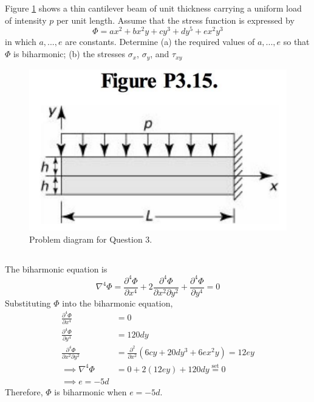 \section{}
Figure \ref{fig:Q3ProblemDiagram} shows a thin cantilever beam of unit thickness carrying a uniform load of intensity $p$ per unit length. 
Assume that the stress function is expressed by
\begin{equation*}
    \Phi = ax^2 + bx^2y + cy^3 + dy^5 + ex^2y^3
\end{equation*}
in which $a, ..., e$ are constants. Determine (a) the required values of $a, ..., e$ so that $\Phi$ is biharmonic;
(b) the stresses $\sigma_x$, $\sigma_y$, and $\tau_{xy}$
\begin{figure}[h]
    \centering
    \includegraphics[width=0.3\linewidth]{Questions/Figures/Q3ProblemDiagram.png}
    \caption{Problem diagram for Question 3.}
    \label{fig:Q3ProblemDiagram}
\end{figure}

\subsection{}
The biharmonic equation is
\begin{equation*}
    \nabla^4 \Phi = \frac{\partial^4 \Phi}{\partial x^4} + 2 \frac{\partial^4 \Phi}{\partial x^2 \partial y^2} + \frac{\partial^4 \Phi}{\partial y^4} = 0
\end{equation*}
Substituting $\Phi$ into the biharmonic equation,
\begin{align*}
    \frac{\partial^4 \Phi}{\partial x^4} &= 0 \\
    \frac{\partial^4 \Phi}{\partial y^4} &= 120dy \\
    \frac{\partial^4 \Phi}{\partial x^2 \partial y^2} &= \frac{\partial^2}{\partial x^2} \left(6cy + 20dy^3 + 6ex^2y\right) = 12ey \\
    \implies \nabla^4 \Phi &= 0 + 2(12ey) + 120dy \overset{\text{set}}{=} 0 \\
    \implies e = -5d
\end{align*}
Therefore, $\Phi$ is biharmonic when $\boxed{e = -5d}$.

